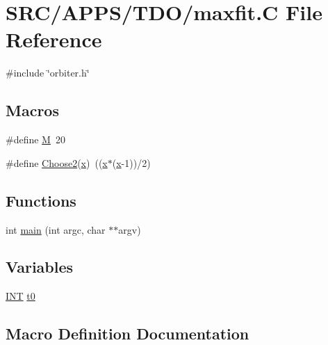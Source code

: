 \hypertarget{maxfit_8_c}{}\section{S\+R\+C/\+A\+P\+P\+S/\+T\+D\+O/maxfit.C File Reference}
\label{maxfit_8_c}
{\ttfamily \#include \char`\"{}orbiter.\+h\char`\"{}}\newline
\subsection*{Macros}
\begin{DoxyCompactItemize}
\item 
\#define \mbox{\hyperlink{maxfit_8_c_a52037c938e3c1b126c6277da5ca689d0}{M}}~20
\item 
\#define \mbox{\hyperlink{maxfit_8_c_a4d54c9f3209eb85acd1df7988bef9c41}{Choose2}}(\mbox{\hyperlink{alphabet2_8_c_a6150e0515f7202e2fb518f7206ed97dc}{x}})~((\mbox{\hyperlink{alphabet2_8_c_a6150e0515f7202e2fb518f7206ed97dc}{x}}$\ast$(\mbox{\hyperlink{alphabet2_8_c_a6150e0515f7202e2fb518f7206ed97dc}{x}}-\/1))/2)
\end{DoxyCompactItemize}
\subsection*{Functions}
\begin{DoxyCompactItemize}
\item 
int \mbox{\hyperlink{maxfit_8_c_a3c04138a5bfe5d72780bb7e82a18e627}{main}} (int argc, char $\ast$$\ast$argv)
\end{DoxyCompactItemize}
\subsection*{Variables}
\begin{DoxyCompactItemize}
\item 
\mbox{\hyperlink{galois_8h_a09fddde158a3a20bd2dcadb609de11dc}{I\+NT}} \mbox{\hyperlink{maxfit_8_c_a4268f4fe222ffb119218a0199f5e1904}{t0}}
\end{DoxyCompactItemize}


\subsection{Macro Definition Documentation}
\mbox{\label{maxfit_8_c_a4d54c9f3209eb85acd1df7988bef9c41}} 
